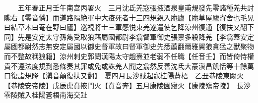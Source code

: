 　　五年春正月壬午南宫丙署火　三月沈氐羌寇張掖酒泉皇甫規發先零諸種羌共討隴右【零音憐】而道路隔絶軍中大疫死者十三四規親入庵廬【庵草屋廬寄舍也毛晃曰結草木曰菴在野曰廬】巡視將士三軍感悦東羌遂遣使乞降涼州復通【復扶乂翻下同】先是安定太守孫雋受取狼藉屬國都尉李翕督軍御史張禀多殺降羌【李翕蓋安定屬國都尉然志無安定屬國以御史督軍故曰督軍御史先悉薦翻爾雅翼狼貪猛之獸聚物而不整故稱狼籍】涼州刺史郭閎漢陽太守趙熹並老弱不任職【任音壬】而皆倚恃權貴不遵法度規到悉條奏其罪或免或誅羌人聞之翕然反善沈氐大豪滇昌飢恬等十餘萬口復詣規降【滇音顛復扶又翻】　夏四月長沙賊起寇桂陽蒼梧　乙丑恭陵東闕火【恭陵安帝陵】戊辰虎賁掖門火【賁音奔】五月康陵園寢火【康陵殤帝陵】　長沙零陵賊入桂陽蒼梧南海交趾